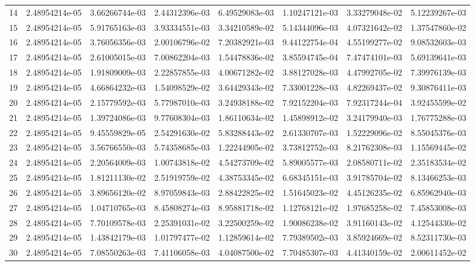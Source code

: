 \documentclass[12pt,a4paper]{article}
\begin{document}
\begin{table}[htbp]
{\begin{tabular}{cccccccc}
14 & 2.48954214e-05 & 3.66266744e-03 & 2.44312396e-03 & 6.49529083e-03 & 1.10247121e-03 & 3.33279048e-02 & 5.12239267e-03 \\
15 & 2.48954214e-05 & 5.91765163e-03 & 3.93334551e-03 & 3.34210589e-02 & 5.14344096e-03 & 4.07321642e-02 & 1.37547860e-02 \\
16 & 2.48954214e-05 & 3.76056356e-03 & 2.00106796e-02 & 7.20382921e-03 & 9.44122754e-04 & 4.55199277e-02 & 9.08532603e-03 \\
17 & 2.48954214e-05 & 2.61005015e-03 & 7.00862204e-03 & 1.54478836e-02 & 3.85594745e-04 & 7.47474101e-03 & 5.69139641e-03 \\
18 & 2.48954214e-05 & 1.91809009e-03 & 2.22857855e-03 & 4.00671282e-02 & 3.88127028e-03 & 4.47992705e-02 & 7.39976139e-03 \\
19 & 2.48954214e-05 & 4.66864232e-03 & 1.54098529e-02 & 3.64429343e-02 & 7.33001228e-03 & 4.82269437e-02 & 9.30876411e-03 \\
20 & 2.48954214e-05 & 2.15779592e-03 & 5.77987010e-03 & 3.24938188e-02 & 7.92152204e-03 & 7.92317244e-04 & 3.92455599e-02 \\
21 & 2.48954214e-05 & 1.39724086e-03 & 9.77608304e-03 & 1.86110634e-02 & 1.45898912e-02 & 3.24179940e-03 & 1.76775288e-03 \\
22 & 2.48954214e-05 & 9.45559829e-05 & 2.54291630e-02 & 5.83288443e-02 & 2.61330707e-03 & 1.52229096e-02 & 8.55045376e-03 \\
23 & 2.48954214e-05 & 3.56766550e-03 & 5.74358685e-03 & 1.22244905e-02 & 3.73812752e-03 & 8.21762308e-03 & 1.15569445e-02 \\
24 & 2.48954214e-05 & 2.20564009e-03 & 1.00743818e-02 & 4.54273709e-02 & 5.89005577e-03 & 2.08580711e-02 & 2.35183534e-02 \\
25 & 2.48954214e-05 & 1.81211130e-02 & 2.51919759e-02 & 4.38753345e-02 & 6.68345151e-03 & 3.91785704e-02 & 8.13466253e-03 \\
26 & 2.48954214e-05 & 3.89656120e-02 & 8.97059843e-03 & 2.88422825e-02 & 1.51645023e-02 & 4.45126235e-02 & 6.85962940e-03 \\
27 & 2.48954214e-05 & 1.04710765e-03 & 8.45808274e-03 & 8.95881718e-02 & 1.12768121e-02 & 1.97685258e-02 & 7.45853008e-03 \\
28 & 2.48954214e-05 & 7.70109578e-03 & 2.25391031e-02 & 3.22500259e-02 & 1.90086238e-02 & 3.91160143e-02 & 4.12544330e-02 \\
29 & 2.48954214e-05 & 1.43842179e-03 & 1.01797477e-02 & 1.12859614e-02 & 7.79389502e-03 & 3.85924669e-02 & 8.52311730e-03 \\
30 & 2.48954214e-05 & 7.08550263e-03 & 7.41106058e-03 & 4.04087500e-02 & 7.70485307e-03 & 4.41340159e-02 & 2.00611452e-02 \\
\bottomrule\end{tabular}}
\end{table}
\clearpage
\end{document}
